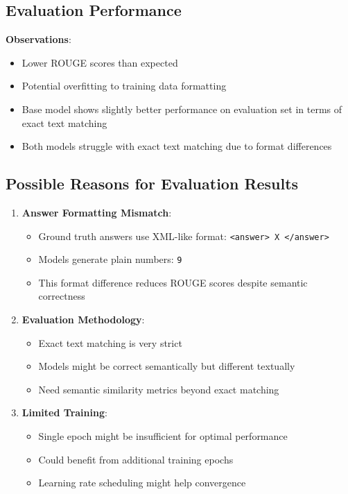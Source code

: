 \documentclass[conference]{IEEEtran}
\begin{document}
\subsection{Evaluation Performance}

\textbf{Observations}:
\begin{itemize}
    \item Lower ROUGE scores than expected
    \item Potential overfitting to training data formatting
    \item Base model shows slightly better performance on evaluation set in terms of exact text matching
    \item Both models struggle with exact text matching due to format differences
\end{itemize}

\subsection{Possible Reasons for Evaluation Results}

\begin{enumerate}
    \item \textbf{Answer Formatting Mismatch}: 
    \begin{itemize}
        \item Ground truth answers use XML-like format: \texttt{<answer> X </answer>}
        \item Models generate plain numbers: \texttt{9}
        \item This format difference reduces ROUGE scores despite semantic correctness
    \end{itemize}
    
    \item \textbf{Evaluation Methodology}:
    \begin{itemize}
        \item Exact text matching is very strict
        \item Models might be correct semantically but different textually
        \item Need semantic similarity metrics beyond exact matching
    \end{itemize}
    
    \item \textbf{Limited Training}:
    \begin{itemize}
        \item Single epoch might be insufficient for optimal performance
        \item Could benefit from additional training epochs
        \item Learning rate scheduling might help convergence
    \end{itemize}
\end{enumerate}
\end{document}
